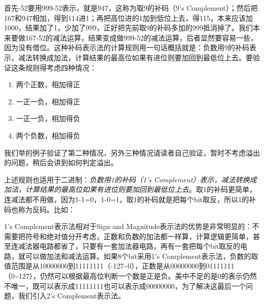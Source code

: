 首先-52要用999-52表示，就是947，这称为取9的补码（9's Complement）；然后把167和947相加，得到114进1；再把高位进的1加到低位上去，得115，本来应该加1000，结果加了1，少加了999，正好把先前取9的补码多加的999抵消掉了。我们本来要做167-52的减法运算，结果变成做999-52的减法运算，后者显然要容易一些，因为没有借位。这种补码表示法的计算规则用一句话概括就是：负数用9的补码表示，减法转换成加法，计算结果的最高位如果有进位则要加回到最低位上去。要验证这条规则得考虑四种情况：


\begin{enumerate}

\item 两个正数，相加得正

\item 一正一负，相加得正

\item 一正一负，相加得负

\item 两个负数，相加得负
\end{enumerate}


我们举的例子验证了第二种情况，另外三种情况请读者自己验证，暂时不考虑溢出的问题，稍后会讲到如何判定溢出。



上述规则也适用于二进制：\emph{负数用1的补码（1's Complement）表示，减法转换成加法，计算结果的最高位如果有进位则要加回到最低位上去}。取1的补码更简单，连减法都不用做，因为1-1=\BookSplit{}0，1-0=\BookSplit{}1，取1的补码就是把每个bit取反，所以1的补码也称为反码。比如：


\begin{BookLiteral}
\end{BookLiteral}


1's Complement表示法相对于Sign and Magnitude表示法的优势是非常明显的：不需要把符号和绝对值分开考虑，正数和负数的加法都一样算，计算逻辑更简单，甚至连减法器电路都省了，只要有一套加法器电路，再有一套把每个bit取反的电路，就可以做加法和减法运算。如果8个bit采用1's Complement表示法，负数的取值范围是从10000000到11111111（-127\textasciitilde{}\BookSplit{}0），正数是从00000000到01111111（0\textasciitilde{}\BookSplit{}127），仍然可以根据最高位判断一个数是正是负。美中不足的是0的表示仍然不唯一，既可以表示成11111111也可以表示成00000000，为了解决这最后一个问题，我们引入2's Complement表示法。


